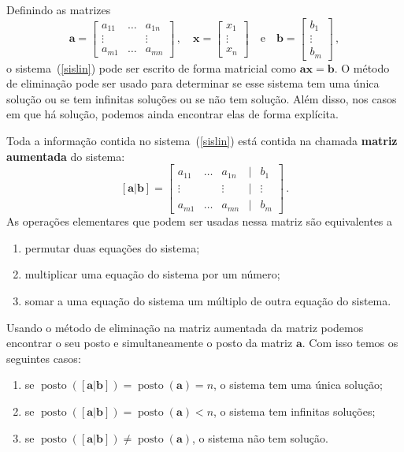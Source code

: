 \documentclass[12pt,a4paper]{report}
\newcommand{\tb}{\textbf}
\newcommand{\mb}{\mathbf}
\DeclareMathOperator{\posto}{posto}
\begin{document}
Definindo as matrizes
$$\mb a=\begin{bmatrix}
  a_{11}&\ldots&a_{1n}\\
  \vdots&&\vdots\\
  a_{m1}&\ldots&a_{mn}
\end{bmatrix}\,,\quad \mb x=\begin{bmatrix}
  x_1\\
  \vdots\\
  x_n
\end{bmatrix}\quad \text{e}\quad \mb b=\begin{bmatrix}
  b_1\\
  \vdots\\
  b_m
\end{bmatrix}\,,$$
o sistema~(\ref{sislin}) pode ser escrito de forma matricial como $\mb a\mb x=\mb b$. O método de eliminação pode ser usado para determinar se esse sistema tem uma única solução ou se tem infinitas soluções ou se não tem solução. Além disso, nos casos em que há solução, podemos ainda encontrar elas de forma explícita.

Toda a informação contida no sistema~(\ref{sislin}) está contida na chamada \tb{matriz aumentada} do sistema:
$$[\mb a|\mb b]=\begin{bmatrix}
  a_{11}&\ldots&a_{1n}&|&b_1\\
  \vdots&&\vdots&|&\vdots\\
  a_{m1}&\ldots&a_{mn}&|&b_m
\end{bmatrix}\,.$$
As operações elementares que podem ser usadas nessa matriz são equivalentes a
\begin{enumerate}
  \item permutar duas equações do sistema;
  \item multiplicar uma equação do sistema por um número;
  \item somar a uma equação do sistema um múltiplo de outra equação do sistema.
\end{enumerate}
Usando o método de eliminação na matriz aumentada da matriz podemos encontrar o seu posto e simultaneamente o posto da matriz $\mb a$. Com isso temos os seguintes casos:
\begin{enumerate}
  \item se $\posto([\mb a|\mb b])=\posto(\mb a)=n$, o sistema tem uma única solução;
  \item se $\posto([\mb a|\mb b])=\posto(\mb a)<n$, o sistema tem infinitas soluções;
  \item se $\posto([\mb a|\mb b])\ne\posto(\mb a)$, o sistema não tem solução.
\end{enumerate}
\end{document}
